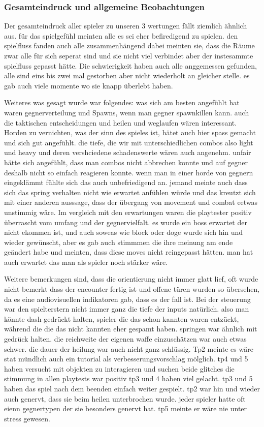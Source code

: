 \documentclass[../Main.tex]{subfiles}
\begin{document}
\subsubsection{Gesamteindruck und allgemeine Beobachtungen} \label{sec:ErgAllgemein}

Der gesamteindruck aller spieler zu unseren 3 wertungen fällt ziemlich ähnlich aus. für das spielgefühl meinten alle es sei eher befiredigend zu spielen. den spielfluss fanden auch alle zusammenhängend dabei meinten sie, dass die Räume zwar alle für sich seperat sind und sie nicht viel verbindet aber der instesammte spielfluss gepasst hätte. Die schwierigkeit haben auch alle anggemessen gefunden, alle sind eins bis zwei mal gestorben aber nicht wiederholt an gleicher stelle. es gab auch viele momente wo sie knapp überlebt haben.

Weiteres was gesagt wurde war folgendes:
was sich am besten angefühlt hat waren gegnerverteilung und Spawns, wenn man gegner spawnkillen kann. auch die taktischen entscheidungen und heilen und weglaufen wären interessant. Horden zu vernichten, was der sinn des spieles ist, hätet auch hier spass gemacht und sich gut angefühlt. die tiefe, die wir mit unterschiedlichen combos also light und heavy und deren vershciedene schadenswerte wären auch angenehm.
unfair hätte sich angefühlt, dass man combos nicht abbrechen konnte und auf gegner deshalb nicht so einfach reagieren konnte. wenn man in einer horde von gegnern eingeklämmt fühlte sich das auch unbefriedigend an. jemand meinte auch dass sich das spring verhalten nicht wie erwartet anfühlen würde und das kreutzt sich mit einer anderen ausssage, dass der übergang von movement und combat eetwas unstimmig wäre.
Im vergleich mit den erwartungen waren die playtester positiv überrascht vom umfang und der gegnervielfalt. es wurde ein boss erwartet der nicht ekommen ist, und auch soweas wie block oder doge wurde sich hin und wieder gewünscht, aber es gab auch stimmmen die ihre meinung am ende geändert habe und meinten, dass diese moves nicht reingepasst hätten. man hat auch erwartet das man als spieler noch stärker wäre.

Weitere bemerkungen sind, dass die orientierung nicht immer glatt lief, oft wurde nicht bemerkt dass der encounter fertig ist und offene türen wurden so übersehen, da es eine audiovisuellen indikatoren gab, dass es der fall ist. Bei der steuerung war den spielterstern nicht immer ganz die tiefe der inputs natürlich. also man könnte dash gedrückt halten, spieler die das schon kannten waren entzückt, während die die das nicht kannten eher gespamt haben. springen war ähnlich mit gedrück halten. die reichweite der eigenen waffe einzuschätzen war auch etwas schwer. die dauer der heilung war auch nicht ganz schlüssig. Tp2 meinte es wäre stat mündlich auch ein tutorial als verbesserungsvorschlag mölglich. tp4 und 5 haben versucht mit objekten zu interagieren und suchen beide glitches
die stimmung in allen playtests war positiv tp3 und 4 haben viel gelacht. tp3 und 5 haben das spiel nach dem beenden einfach weiter gespielt. tp2 war hin und wieder auch genervt, dass sie beim heilen unterbrochen wurde. jeder spieler hatte oft eienn gegnertypen der sie besonders genervt hat. tp5 meinte er wäre nie unter stress gewesen.
\end{document}
